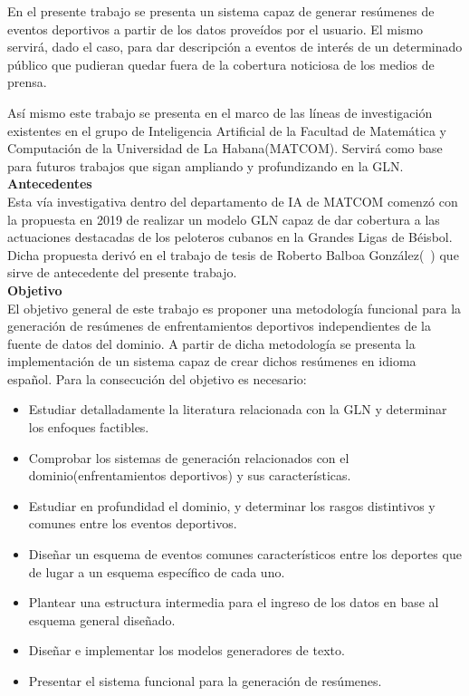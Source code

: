     En el presente trabajo se presenta un sistema capaz de generar resúmenes de eventos deportivos a partir de los datos prove\'idos por 
el usuario. El mismo servirá, dado el caso, para dar descripción a eventos de interés de un determinado público que pudieran quedar fuera 
de la cobertura noticiosa de los medios de prensa.

    Así mismo este trabajo se presenta en el marco de las líneas de investigación existentes en el grupo de Inteligencia Artificial de la 
Facultad de Matemática y Computación de la Universidad de La Habana(MATCOM). Servirá como base para futuros trabajos que sigan ampliando y 
profundizando en la GLN.\\


    \textbf{Antecedentes}\\

    Esta vía investigativa dentro del departamento de IA de MATCOM comenzó con la propuesta en 2019 de realizar un modelo GLN capaz 
de dar cobertura a las actuaciones destacadas de los peloteros cubanos en la Grandes Ligas de Béisbol. Dicha propuesta derivó en el trabajo 
de tesis de Roberto Balboa González(~\cite{balboa2020}) que sirve de antecedente del presente trabajo.\\

    \textbf{Objetivo}\\

    El objetivo general de este trabajo es proponer una metodología funcional para la generación de res\'umenes de enfrentamientos deportivos 
independientes de la fuente de datos del dominio. A partir de dicha metodología se presenta la implementación de un sistema capaz de 
crear dichos resúmenes en idioma español. 
    Para la consecución del objetivo es necesario:

    \begin{itemize}
        \item Estudiar detalladamente la literatura relacionada con la GLN y determinar los enfoques factibles. 
        \item Comprobar los sistemas de generación relacionados con el dominio(enfrentamientos deportivos) y sus caracter\'isticas.
        \item Estudiar en profundidad el dominio, y determinar los rasgos distintivos y comunes entre los eventos deportivos.
        \item Diseñar un esquema de eventos comunes característicos entre los deportes que de lugar a un esquema específico de cada uno.
        \item Plantear una estructura intermedia para el ingreso de los datos en base al esquema general diseñado. 
        \item Diseñar e implementar los modelos generadores de texto.
        \item Presentar el sistema funcional para la generación de resúmenes.       
    \end{itemize}

